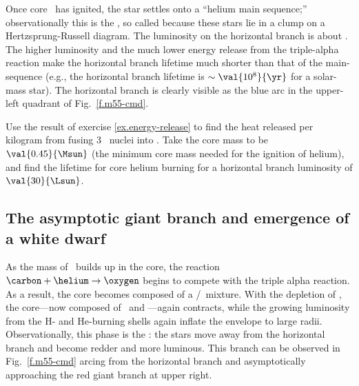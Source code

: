 Once core \helium\ has ignited, the star settles onto a ``helium main sequence;'' observationally this is the , so called because these stars lie in a clump on a Hertzsprung-Russell diagram. The luminosity on the horizontal branch is about . The higher luminosity and the much lower energy release from the triple-alpha reaction make the horizontal branch lifetime much shorter than that of the main-sequence (e.g., the horizontal branch lifetime is $\sim \val{10^{8}}{\yr}$ for a solar-mass star). The horizontal branch is clearly visible as the blue arc in the upper-left quadrant of Fig.~\ref{f.m55-cmd}.

\begin{exercisebox}
Use the result of exercise \ref{ex.energy-release} to find the heat released per kilogram from fusing 3 \helium\ nuclei into \carbon. Take the core mass to be $\val{0.45}{\Msun}$ (the minimum core mass needed for the ignition of helium), and find the lifetime for core helium burning for a horizontal branch luminosity of $\val{30}{\Lsun}$.
\end{exercisebox}

\subsection{The asymptotic giant branch and emergence of a white dwarf}

As the mass of \carbon\ builds up in the core, the reaction $\carbon+\helium\to\oxygen$ begins to compete with the triple alpha reaction. As a result, the core becomes composed of a \carbon/\oxygen\ mixture.
With the depletion of \helium, the core---now composed of \carbon\ and \oxygen---again contracts, while the growing luminosity from the H- and He-burning shells again inflate the envelope to large radii. Observationally, this phase is the : the stars move away from the horizontal branch and become redder and more luminous. This branch can be observed in Fig.~\ref{f.m55-cmd} arcing from the horizontal branch and asymptotically approaching the red giant branch at upper right. 

